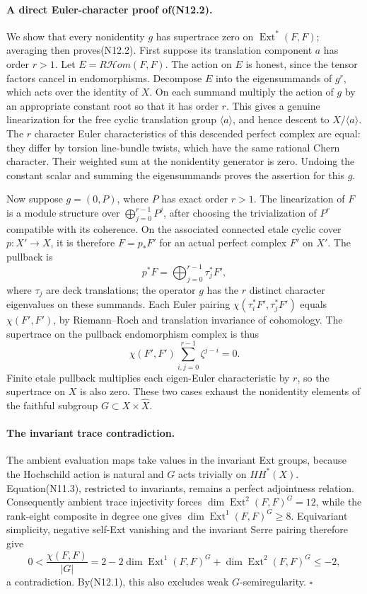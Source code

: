 \paragraph{A direct Euler-character proof of(N12.2).}
We show that every nonidentity $g$ has supertrace zero on
$\operatorname{Ext}^*(F,F)$; averaging then proves(N12.2).
First suppose its translation component $a$ has order $r>1$.
Let $E=R\mathcal Hom(F,F)$. The action on $E$ is honest, since
the tensor factors cancel in endomorphisms. Decompose $E$ into
the eigensummands of $g^r$, which acts over the identity of $X$.
On each summand multiply the action of $g$ by an appropriate
constant root so that it has order $r$. This gives a genuine
linearization for the free cyclic translation group
$\langle a\rangle$, and hence descent to $X/\langle a\rangle$.
The $r$ character Euler characteristics of this descended
perfect complex are equal: they differ by torsion line-bundle
twists, which have the same rational Chern character.
Their weighted sum at the nonidentity generator is zero.
Undoing the constant scalar and summing the eigensummands
proves the assertion for this $g$.

Now suppose $g=(0,P)$, where $P$ has exact order $r>1$.
The linearization of $F$ is a module structure over
$\bigoplus_{j=0}^{r-1}P^j$, after choosing the trivialization
of $P^r$ compatible with its coherence. On the associated
connected etale cyclic cover $p:X'\to X$, it is therefore
$F=p_*F'$ for an actual perfect complex $F'$ on $X'$.
The pullback is
\[
 p^*F=\bigoplus_{j=0}^{r-1}\tau_j^*F',
\]
where $\tau_j$ are deck translations; the operator $g$ has the
$r$ distinct character eigenvalues on these summands. Each
Euler pairing
$\chi(\tau_i^*F',\tau_j^*F')$ equals $\chi(F',F')$, by
Riemann--Roch and translation invariance of cohomology.
The supertrace on the pullback endomorphism complex is thus
\[
 \chi(F',F')\sum_{i,j=0}^{r-1}\zeta^{j-i}=0.
\]
Finite etale pullback multiplies each eigen-Euler characteristic
by $r$, so the supertrace on $X$ is also zero.
These two cases exhaust the nonidentity elements of the
faithful subgroup $G\subset X\times\widehat X$.

\paragraph{The invariant trace contradiction.}
The ambient evaluation maps take values in the invariant Ext
groups, because the Hochschild action is natural and $G$ acts
trivially on $HH^*(X)$. Equation(N11.3), restricted to invariants,
remains a perfect adjointness relation. Consequently ambient
trace injectivity forces
$\dim\operatorname{Ext}^2(F,F)^G=12$, while the rank-eight
composite in degree one gives
$\dim\operatorname{Ext}^1(F,F)^G\ge8$.
Equivariant simplicity, negative self-Ext vanishing and the
invariant Serre pairing therefore give
\[
 0<\frac{\chi(F,F)}{|G|}
    =2-2\dim\operatorname{Ext}^1(F,F)^G
           +\dim\operatorname{Ext}^2(F,F)^G
    \le-2,
\]
a contradiction. By(N12.1), this also excludes weak
$G$-semiregularity. \hfill$\square$


